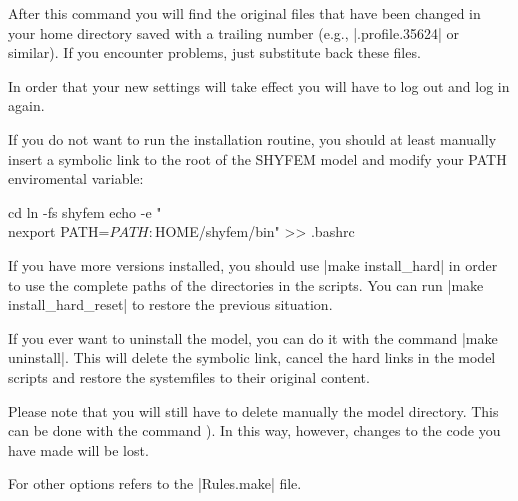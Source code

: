 After this command you will find the original files that have been changed
in your home directory saved with a trailing number (e.g., |.profile.35624|
or similar).  If you encounter problems, just substitute back these files.

In order that your new settings will take effect you will have to log
out and log in again.

If you do not want to run the installation routine, you should at least
manually insert a symbolic link to the root of the SHYFEM model and
modify your PATH enviromental variable:

\begin{codem}
    cd
    ln -fs \shydir shyfem
    echo -e "\\nexport PATH=$PATH:$HOME/shyfem/bin" >> .bashrc
\end{codem}

If you have more versions installed, you should use |make install_hard|
in order to use the complete paths of the directories in the scripts.
You can run |make install_hard_reset| to restore the previous situation.

If you ever want to uninstall the model, you can do it with the command
|make uninstall|. This will delete the symbolic link, cancel the hard
links in the model scripts and restore the systemfiles \ttt{\sysfiles}
to their original content.

Please note that you will still have to delete manually the model
directory. This can be done with the command ). In
this way, however, changes to the code you have made will be lost.

For other options refers to the |Rules.make| file.
